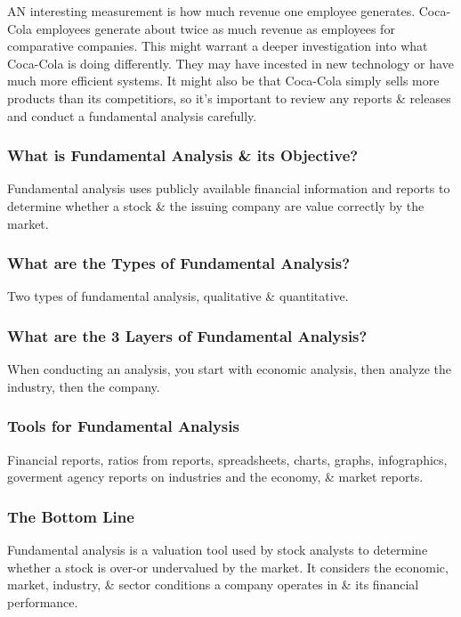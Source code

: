 \documentclass{article}
\begin{document}
	AN interesting measurement is how much revenue one employee generates. Coca-Cola employees generate about twice as much revenue as employees for comparative companies. This might warrant a deeper 
	investigation into what Coca-Cola is doing differently. They may have incested in new technology or have much more efficient systems. It might also be that Coca-Cola simply sells more products than 
	its competitiors, so it's important to review any reports \& releases and conduct a fundamental analysis carefully. \newline \newline

	\subsubsection{What is Fundamental Analysis \& its Objective?}
	Fundamental analysis uses publicly available financial information and reports to determine whether a stock \& the issuing company are value correctly by the market. \newline

	\subsubsection{What are the Types of Fundamental Analysis?}
	Two types of fundamental analysis, qualitative \& quantitative.

	\subsubsection{What are the 3 Layers of Fundamental Analysis?}
	When conducting an analysis, you start with economic analysis, then analyze the industry, then the company. \newline

	\subsubsection{Tools for Fundamental Analysis}
	Financial reports, ratios from reports, spreadsheets, charts, graphs, infographics, goverment agency reports on industries and the economy, \& market reports. \newline

	\subsubsection{The Bottom Line}
	Fundamental analysis is a valuation tool used by stock analysts to determine whether a stock is over-or undervalued by the market. It considers the economic, market, industry, \& sector conditions
	a company operates in \& its financial performance. \newline
\end{document}
